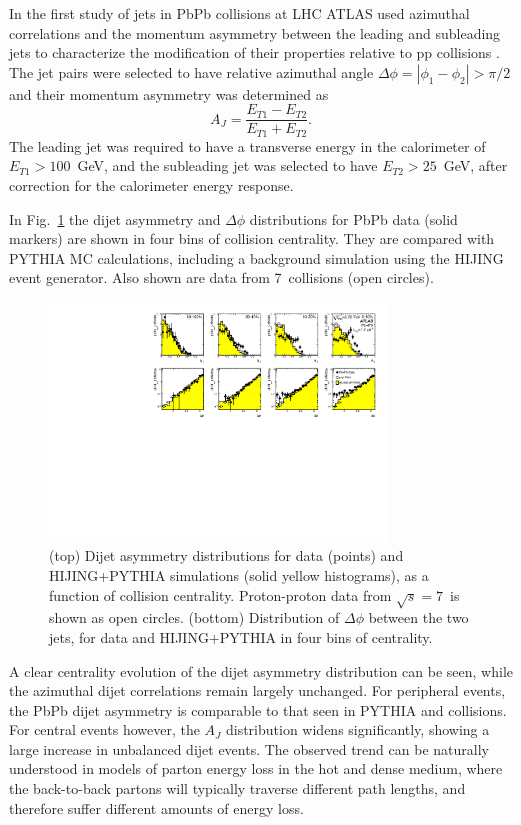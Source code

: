 In the first study of jets in PbPb collisions at LHC ATLAS used azimuthal correlations and the 
momentum asymmetry between the leading and subleading jets to characterize the modification
of their properties relative to pp collisions \cite{Aad:2010bu}.
The jet pairs were selected to have relative azimuthal angle $\Delta \phi =|\phi_1-\phi_2| > \pi/2$
and their momentum asymmetry was determined as
\begin{equation}
A_J = \frac{E_{T1}-E_{T2}}{E_{T1}+E_{T2}}.
\end{equation}
The leading jet was required to have a transverse energy in the calorimeter of $E_{T1} > 100$~GeV,
and the subleading jet was selected to have $E_{T2} > 25$~GeV, after correction for 
the calorimeter energy response. 

In Fig.~\ref{fig:GR:final_4x2} the dijet asymmetry and $\Delta\phi$ distributions for PbPb data (solid markers) 
are shown in four bins of collision centrality. They are compared with PYTHIA MC calculations, including a 
background simulation using the HIJING event generator. Also shown are data from 7\TeV\
\pp collisions (open circles).
\begin{figure}[thb]
\begin{center}
\includegraphics[width=0.8\textwidth]{jetfigures/final_4x2_23_newpp.pdf}
\caption{
(top) Dijet asymmetry distributions for data (points) and HIJING+PYTHIA simulations (solid yellow histograms),
as a function of collision centrality.  Proton-proton data from $\sqrt{s}=7$\TeV\ is shown as open circles.
(bottom) Distribution of $\Delta\phi$ between the two jets, for data and HIJING+PYTHIA in four bins of centrality.
\label{fig:GR:final_4x2}
}
\end{center}
\end{figure}

A clear centrality evolution of the dijet asymmetry distribution can be seen, while the azimuthal
dijet correlations remain largely unchanged. For peripheral events, the PbPb dijet asymmetry
is comparable to that seen in PYTHIA and \pp collisions. For central events however, 
the $A_J$ distribution widens significantly, showing a large increase in unbalanced
dijet events. The observed trend can be naturally understood in models of parton energy
loss in the hot and dense medium, where the back-to-back partons will typically traverse
different path lengths, and therefore suffer different amounts of energy loss.

